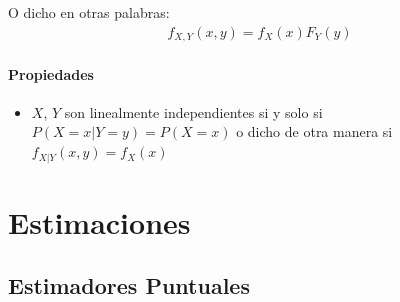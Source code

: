 \documentclass[12pt, fleqn]{report}                             %
\theoremstyle{break}                                            %
\begin{document}
            O dicho en otras palabras:
            \begin{align*}
                f_{X, Y}(x, y) = f_X(x) F_Y(y)
            \end{align*}


            \vspace{1em}
            \subsection{Propiedades}
                    
                \begin{itemize}
                    \item 
                        $X$, $Y$ son linealmente independientes
                        si y solo si $P(X = x | Y = y) = P(X = x)$
                        o dicho de otra manera si $f_{X |Y} (x, y) = f_X(x)$


                \end{itemize}




\part{Estimaciones}
\clearpage



    \chapter{Estimadores Puntuales}

        
        \clearpage
\end{document}
